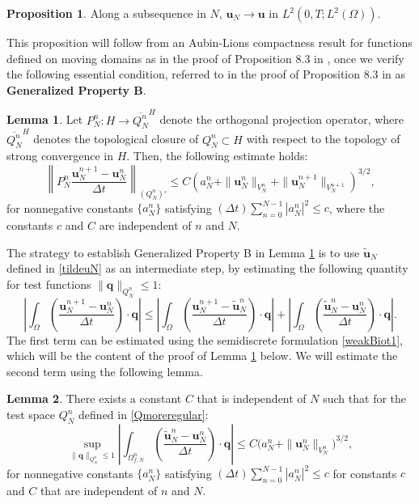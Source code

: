 \documentclass[11pt]{article}
\newcommand{\bd}{\boldsymbol}
\theoremstyle{definition}
\newtheorem{proposition}{Proposition}[section]
\newtheorem{lemma}{Lemma}[section]
\begin{document}
\begin{proposition}\label{compactfluid}
Along a subsequence in $N$, $\bd{u}_{N} \to \bd{u}$ in $L^{2}(0, T; L^{2}(\Omega))$. 
\end{proposition}

This proposition will follow from an Aubin-Lions compactness result \cite{AubinLions} for functions defined on moving domains as in the proof of Proposition 8.3 in \cite{FPSIJMPA}, once we verify the following essential condition, referred to in the proof of Proposition 8.3 in \cite{FPSIJMPA} as \textbf{Generalized Property B}.

\begin{lemma}\label{generalizedB}
Let $P^{n}_{N}: H \to \overline{Q^{n}_{N}}^{H}$ denote the orthogonal projection operator, where $\overline{Q^{n}_{N}}^{H}$ denotes the topological closure of $Q^{n}_{N} \subset H$ with respect to the topology of strong convergence in $H$. Then, the following estimate holds:
\begin{equation*}
\left\|P^{n}_{N} \frac{\bd{u}^{n + 1}_{N} - \bd{u}^{n}_{N}}{\Delta t} \right\|_{(Q^{n}_{N})'} \le C\left(a^{n}_{N} + \|\bd{u}^{n}_{N}\|_{V^{n}_{N}} + \|\bd{u}^{n + 1}_{N}\|_{V^{n + 1}_{N}}\right)^{3/2},
\end{equation*}
for nonnegative constants $\{a^{n}_{N}\}$ satisfying $(\Delta t) \displaystyle \sum_{n = 0}^{N - 1} |a^{n}_{N}|^{2} \le c$, where the constants $c$ and $C$ are independent of $n$ and $N$. 
\end{lemma}

The strategy to establish Generalized Property B in Lemma \ref{generalizedB} is to use $\tilde{\bd{u}}_{N}$ defined in \eqref{tildeuN} as an intermediate step, by estimating the following quantity for test functions $\|\bd{q}\|_{Q^{n}_{N}} \le 1$:
\begin{equation}\label{triangleineq}
\left|\int_{\Omega} \left(\frac{\bd{u}^{n + 1}_{N} - \bd{u}^{n}_{N}}{\Delta t}\right) \cdot \bd{q}\right| \le \left|\int_{\Omega} \left(\frac{\bd{u}^{n + 1}_{N} - \tilde{\bd{u}}^{n}_{N}}{\Delta t}\right) \cdot \bd{q}\right| + \left|\int_{\Omega} \left(\frac{\tilde{\bd{u}}^{n}_{N} - \bd{u}^{n}_{N}}{\Delta t}\right) \cdot \bd{q}\right|.
\end{equation}
The first term can be estimated using the semidiscrete formulation \eqref{weakBiot1}, which will be the content of the proof of Lemma \ref{generalizedB} below. We will estimate the second term using the following lemma.

\begin{lemma}\label{tildecomp}
There exists a constant $C$ that is independent of $N$ such that for the test space $Q^{n}_{N}$ defined in \eqref{Qmoreregular}:
\begin{equation*}
\sup_{\|\bd{q}\|_{Q^{n}_{N}} \le 1} \left|\int_{\Omega^{n}_{f, N}} \left(\frac{\tilde{\bd{u}}^{n}_{N} - \bd{u}^{n}_{N}}{\Delta t}\right) \cdot \bd{q}\right| \le C\Big(a^{n}_{N} + \|\bd{u}^{n}_{N}\|_{V^{n}_{N}}\Big)^{3/2},
\end{equation*}
for nonnegative constants $\{a^{n}_{N}\}$ satisfying $\displaystyle (\Delta t) \sum_{n = 0}^{N - 1} |a^{n}_{N}|^{2} \le c$ for constants $c$ and $C$ that are independent of $n$ and $N$. 
\end{lemma}
\end{document}
